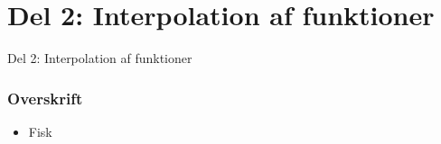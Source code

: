 \section{Del 2: Interpolation af funktioner}
\begin{frame}
\centering
\Huge
Del 2: Interpolation af funktioner
\end{frame}
%
\begin{frame}
\frametitle{Overskrift}
\begin{itemize}
\item Fisk
\end{itemize}
\end{frame}
